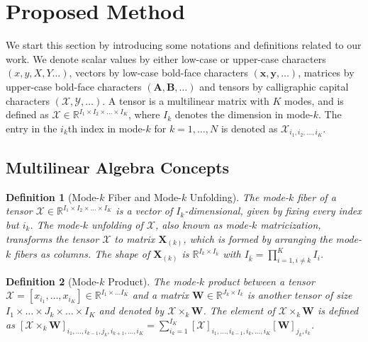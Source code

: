 \documentclass[conference,usletter]{IEEEtran}
\newtheorem{defn}{Definition}
\begin{document}
\section{Proposed Method}\label{S:ProposedMethod}

We start this section by introducing some notations and definitions related to our work. We denote scalar values by either low-case or upper-case characters $(x, y, X, Y \dots)$, vectors by low-case bold-face characters $(\mathbf{x}, \mathbf{y}, \dots)$, matrices by upper-case bold-face characters $(\mathbf{A}, \mathbf{B}, \dots)$ and tensors by calligraphic capital characters $(\mathcal{X}, \mathcal{Y}, \dots)$. A tensor is a multilinear matrix with $K$ modes, and is defined as $\mathcal{X} \in \mathbb{R}^{I_1 \times I_2 \times \dots \times I_K}$, where $I_{k}$ denotes the dimension in mode-$k$. The entry in the $i_k$th index in mode-$k$ for $k=1,\dots, N$ is denoted as $\mathcal{X}_{i_1,i_2,\dots,i_K}$.


\subsection{Multilinear Algebra Concepts}
\begin{defn}[Mode-$k$ Fiber and Mode-$k$ Unfolding]\label{def1}
	The mode-$k$ fiber of a tensor $\mathcal{X} \in \mathbb{R}^{I_1 \times I_2 \times \dots \times I_K}$ is a vector of $I_k$-dimensional, given by fixing every index but $i_k$. The mode-$k$ unfolding of $\mathcal{X}$, also known as mode-$k$ matricization, transforms the tensor $\mathcal{X}$ to matrix $\mathbf{X}_{(k)}$, which is formed by arranging the mode-$k$ fibers as columns. The shape of $\mathbf{X}_{(k)}$ is $\mathbb{R}^{I_k \times I_{\bar{k}}}$ with $I_{\bar{k}}=\prod_{i=1,i \neq k}^{K} I_i$.
\end{defn}

\begin{defn}[Mode-$k$ Product]\label{def2}
	The mode-$k$ product between a tensor $\mathcal{X}=[x_{i_1},\dots , x_{i_K}] \in  \mathbb{R}^{I_1 \times \dots I_K}$ and a matrix $\mathbf{W}\in \mathbb{R}^{J_{k}\times I_k}$ is another tensor of size $I_1\times \dots \times J_{k}\times \dots \times I_K$ and denoted by $\mathcal{X} \times_{k} \mathbf{W}$. The element of $\mathcal{X} \times_{k} \mathbf{W}$ is defined as $[\mathcal{X}\times_{k}\mathbf{W}]_{i_1, \dots , i_{k-1}, j_k, i_{k+1},\dots, i_K}=\sum_{i_k=1}^{I_K}[\mathcal{X}]_{i_1,\dots,i_{k-1},i_k,\dots, i_K}[\mathbf{W}]_{j_k,i_k}$.
\end{defn}
\end{document}
